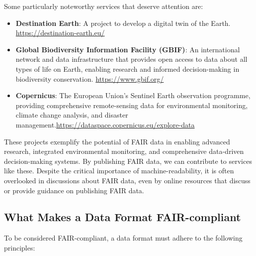 \documentclass[a4paper,12pt]{article}
\begin{document}
Some particularly noteworthy services that deserve attention are:
\begin{itemize}
    \item \textbf{Destination Earth}: A project to develop a digital twin of the Earth. \url{https://destination-earth.eu/}
    \item \textbf{Global Biodiversity Information Facility (GBIF)}: An international network and data infrastructure that provides open access to data about all types of life on Earth, enabling research and informed decision-making in biodiversity conservation. \url{https://www.gbif.org/}
    \item \textbf{Copernicus}: The European Union's Sentinel Earth observation programme, providing comprehensive remote-sensing data for environmental monitoring, climate change analysis, and disaster management.\url{https://dataspace.copernicus.eu/explore-data}
\end{itemize}

These projects exemplify the potential of FAIR data in enabling advanced research, integrated environmental monitoring, and comprehensive data-driven decision-making systems. By publishing FAIR data, we can contribute to services like these. Despite the critical importance of machine-readability, it is often overlooked in discussions about FAIR data, even by online resources that discuss or provide guidance on publishing FAIR data.

\subsection{What Makes a Data Format FAIR-compliant}

To be considered FAIR-compliant, a data format must adhere to the following principles:
\end{document}
